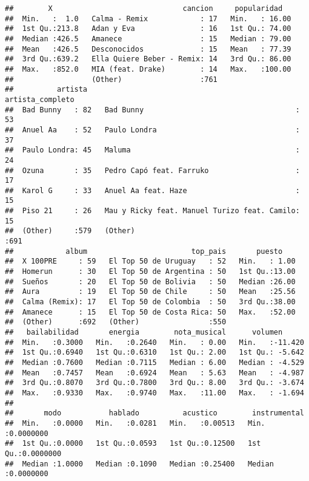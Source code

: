 \documentclass[]{article}
\begin{document}
\begin{verbatim}
##        X                              cancion     popularidad    
##  Min.   :  1.0   Calma - Remix            : 17   Min.   : 16.00  
##  1st Qu.:213.8   Adan y Eva               : 16   1st Qu.: 74.00  
##  Median :426.5   Amanece                  : 15   Median : 79.00  
##  Mean   :426.5   Desconocidos             : 15   Mean   : 77.39  
##  3rd Qu.:639.2   Ella Quiere Beber - Remix: 14   3rd Qu.: 86.00  
##  Max.   :852.0   MIA (feat. Drake)        : 14   Max.   :100.00  
##                  (Other)                  :761                   
##          artista                                        artista_completo
##  Bad Bunny   : 82   Bad Bunny                                   : 53    
##  Anuel Aa    : 52   Paulo Londra                                : 37    
##  Paulo Londra: 45   Maluma                                      : 24    
##  Ozuna       : 35   Pedro Capó feat. Farruko                    : 17    
##  Karol G     : 33   Anuel Aa feat. Haze                         : 15    
##  Piso 21     : 26   Mau y Ricky feat. Manuel Turizo feat. Camilo: 15    
##  (Other)     :579   (Other)                                     :691    
##            album                        top_pais       puesto     
##  X 100PRE     : 59   El Top 50 de Uruguay   : 52   Min.   : 1.00  
##  Homerun      : 30   El Top 50 de Argentina : 50   1st Qu.:13.00  
##  Sueños       : 20   El Top 50 de Bolivia   : 50   Median :26.00  
##  Aura         : 19   El Top 50 de Chile     : 50   Mean   :25.56  
##  Calma (Remix): 17   El Top 50 de Colombia  : 50   3rd Qu.:38.00  
##  Amanece      : 15   El Top 50 de Costa Rica: 50   Max.   :52.00  
##  (Other)      :692   (Other)                :550                  
##   bailabilidad       energia        nota_musical      volumen       
##  Min.   :0.3000   Min.   :0.2640   Min.   : 0.00   Min.   :-11.420  
##  1st Qu.:0.6940   1st Qu.:0.6310   1st Qu.: 2.00   1st Qu.: -5.642  
##  Median :0.7600   Median :0.7115   Median : 6.00   Median : -4.529  
##  Mean   :0.7457   Mean   :0.6924   Mean   : 5.63   Mean   : -4.987  
##  3rd Qu.:0.8070   3rd Qu.:0.7800   3rd Qu.: 8.00   3rd Qu.: -3.674  
##  Max.   :0.9330   Max.   :0.9740   Max.   :11.00   Max.   : -1.694  
##                                                                     
##       modo           hablado          acustico        instrumental      
##  Min.   :0.0000   Min.   :0.0281   Min.   :0.00513   Min.   :0.0000000  
##  1st Qu.:0.0000   1st Qu.:0.0593   1st Qu.:0.12500   1st Qu.:0.0000000  
##  Median :1.0000   Median :0.1090   Median :0.25400   Median :0.0000000  

\end{verbatim}
\end{document}
